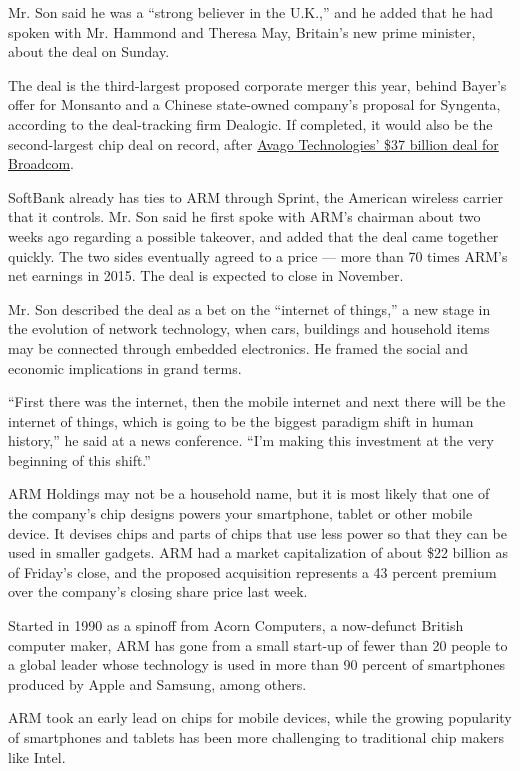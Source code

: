 Mr. Son said he was a ``strong believer in the U.K.,'' and he added that
he had spoken with Mr. Hammond and Theresa May, Britain's new prime
minister, about the deal on Sunday.

The deal is the third-largest proposed corporate merger this year,
behind Bayer's offer for Monsanto and a Chinese state-owned company's
proposal for Syngenta, according to the deal-tracking firm Dealogic. If
completed, it would also be the second-largest chip deal on record,
after
\href{http://www.nytimes.com/2015/05/29/business/dealbook/avago-agrees-to-acquire-broadcom-for-37-billion.html}{Avago
Technologies' \$37 billion deal for Broadcom}.

SoftBank already has ties to ARM through Sprint, the American wireless
carrier that it controls. Mr. Son said he first spoke with ARM's
chairman about two weeks ago regarding a possible takeover, and added
that the deal came together quickly. The two sides eventually agreed to
a price --- more than 70 times ARM's net earnings in 2015. The deal is
expected to close in November.

Mr. Son described the deal as a bet on the ``internet of things,'' a new
stage in the evolution of network technology, when cars, buildings and
household items may be connected through embedded electronics. He framed
the social and economic implications in grand terms.

``First there was the internet, then the mobile internet and next there
will be the internet of things, which is going to be the biggest
paradigm shift in human history,'' he said at a news conference. ``I'm
making this investment at the very beginning of this shift.''

ARM Holdings may not be a household name, but it is most likely that one
of the company's chip designs powers your smartphone, tablet or other
mobile device. It devises chips and parts of chips that use less power
so that they can be used in smaller gadgets. ARM had a market
capitalization of about \$22 billion as of Friday's close, and the
proposed acquisition represents a 43 percent premium over the company's
closing share price last week.

Started in 1990 as a spinoff from Acorn Computers, a now-defunct British
computer maker, ARM has gone from a small start-up of fewer than 20
people to a global leader whose technology is used in more than 90
percent of smartphones produced by Apple and Samsung, among others.

ARM took an early lead on chips for mobile devices, while the growing
popularity of smartphones and tablets has been more challenging to
traditional chip makers like Intel.

